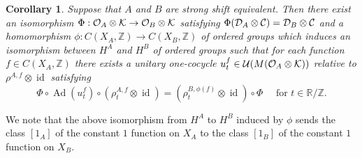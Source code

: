 \documentclass[11pt]{article}
\newtheorem{corollary}[theorem]{Corollary}
\theoremstyle{plain}
\theoremstyle{definition}
\numberwithin{equation}{section}
\newcommand{\id}{\operatorname{id}}
\newcommand{\Ad}{\operatorname{Ad}}
\newcommand{\RZ}{\mathbb{R}/{\mathbb{Z}}}
\newcommand{\Z}{\mathbb{Z}}
\begin{document}
\begin{corollary}\label{cor:SSE}
Suppose that 
$A$ and $B$ are strong shift equivalent.
Then there exist an isomorphism
$\Phi:{{\mathcal{O}}_A}\otimes{\mathcal{K}} \rightarrow {{\mathcal{O}}_B}\otimes{\mathcal{K}}$ satisfying 
$\Phi({{\mathcal{D}}_A}\otimes{\mathcal{C}}) = {{\mathcal{D}}_B}\otimes{\mathcal{C}}$
and a homomorphism
$\phi:C(X_A,\Z) \rightarrow C(X_B,\Z)$
of ordered groups
which induces an isomorphism
between
$H^A$ and $H^B$ of ordered groups
such that
for each function
$f\in C(X_A,\Z)$
there exists a unitary one-cocycle
$u_t^f \in {{\mathcal{U}}}(M({{\mathcal{O}}_A}\otimes{\mathcal{K}}))$  
relative to 
$\rho^{A,f} \otimes\id$
satisfying 
\begin{equation*}
\Phi \circ \Ad(u_t^f) \circ (\rho^{A,f}_t\otimes \id)
 = (\rho^{B,\phi(f)}_t\otimes\id) \circ \Phi
\quad
\text{ for }
 t \in \RZ.
\end{equation*}
\end{corollary}
We note that the above isomorphism
from $H^A$ to $H^B$ induced  by $\phi$ 
sends the class
$[1_A]$ of the constant $1$ function on $X_A$
to the class
$[1_B]$ of the constant $1$ function on $X_B$.




\end{document}
